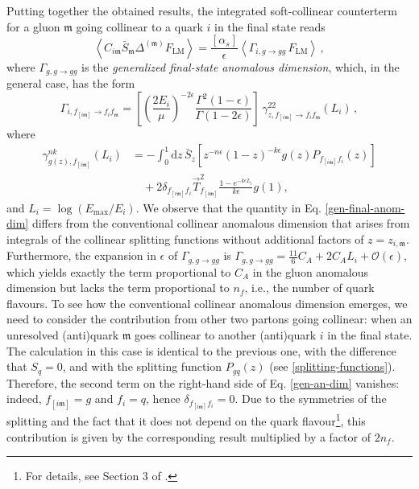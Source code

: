 \documentclass[a4paper, 12pt]{book}
\newcommand{\um}{\mathfrak{m}}
\begin{document}
Putting together the obtained results, the integrated soft-collinear counterterm for a gluon $\um$ going collinear to a quark $i$ in the final state reads
\begin{equation}
  \left<  C_{i\um} \bar{S}_{\um} \Delta^{(\um)} F_{\mathrm{LM}}\right> = \frac{[\alpha_s]}{\epsilon} \left< \Gamma_{i,g \to gg} \, F_{\mathrm{LM}}\right> \, ,
\end{equation}
where $\Gamma_{g,g \to gg}$ is the \emph{generalized final-state anomalous dimension}, which, in the general case, has the form
\begin{equation}
  \Gamma_{i,f_{[i\um]}\to f_i f_\um} = \left[\left(\frac{2E_i}{\mu}\right)^{-2\epsilon} \frac{\Gamma^2(1-\epsilon)}{\Gamma(1-2\epsilon)}\right] \, \gamma^{22}_{z,f_{[i\um]} \to f_i f_\um} (L_i) \, ,
  \label{gen-final-anom-dim}
\end{equation}
where 
\begin{align}
  \gamma^{nk}_{g(z),f_{[i\um]}} (L_i) 
  &= - \int_0^1 \mathrm{d}z \, \bar{S}_z \left[z^{-n\epsilon}(1-z)^{-k\epsilon}g(z)P_{f_{[i\um]}f_i}(z)\right] \nonumber \\
  &\quad + 2 \delta_{f_{[i\um]}f_i} \vec{T}^2_{f_{[i\um]}} \frac{1-e^{-k \epsilon L_i}}{k\epsilon} g(1) ,
  \label{gen-an-dim}
\end{align}
and $L_i=\log{\left(E_{\mathrm{max}}/E_i\right)}$. We observe that the quantity in Eq. \ref{gen-final-anom-dim} differs from the conventional collinear anomalous dimension that arises from integrals of the collinear splitting functions without additional factors of $z=z_{i,\um}$. Furthermore, the expansion in $\epsilon$ of $\Gamma_{g,g \to gg}$ is $\Gamma_{g,g \to gg}=\frac{11}{6}C_A+2C_AL_i+\mathcal{O}(\epsilon)$, which yields exactly the term proportional to $C_A$ in the gluon anomalous dimension but lacks the term proportional to $n_f$, i.e., the number of quark flavours. To see how the conventional collinear anomalous dimension emerges, we need to consider the contribution from other two partons going collinear: when an unresolved (anti)quark $\um$ goes collinear to another (anti)quark $i$ in the final state. The calculation in this case is identical to the previous one, with the difference that $S_q = 0$, and with the splitting function $P_{gq}(z)$ (see \ref{splitting-functions}). Therefore, the second term on the right-hand side of Eq. \ref{gen-an-dim} vanishes: indeed, $f_{[i\um]}=g$ and $f_i=q$, hence $\delta_{f_{[i\um]}f_i}=0$. Due to the symmetries of the splitting and the fact that it does not depend on the quark flavour\footnote{For details, see Section 3 of \cite{Devoto:2025kin}.}, this contribution is given by the corresponding result multiplied by a factor of $2n_f$.
\end{document}
